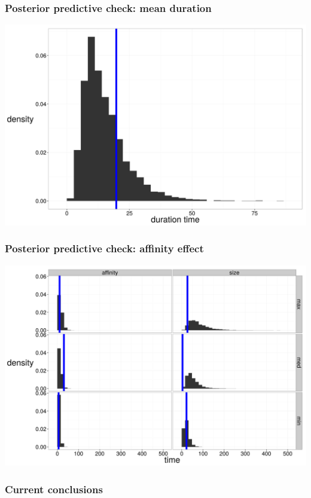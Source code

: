 \documentclass{beamer}
\begin{document}
\begin{frame}
  \frametitle{Posterior predictive check: mean duration}
  \begin{center}
    \includegraphics[height = 0.8\textheight, width = \textwidth, keepaspectratio = true]{figure/mean_ppc}
  \end{center}
\end{frame}

\begin{frame}
  \frametitle{Posterior predictive check: affinity effect}
  \begin{center}
    \includegraphics[height = 0.8\textheight, width = \textwidth, keepaspectratio = true]{figure/bio_ppc}
  \end{center}
\end{frame}

\begin{frame}
  \frametitle{Current conclusions}
\end{frame}
\end{document}

